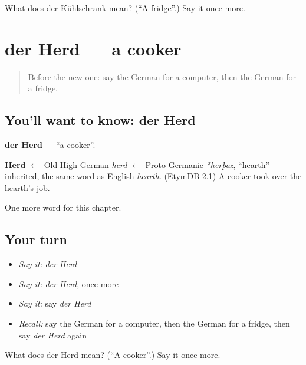 \begin{tcolorbox}[breakable,colback=teal!4,colframe=teal!35!black,title={Before you move on}]
What does der Kühlschrank mean? (\textquotedblleft{}A fridge\textquotedblright{}.) Say it once more.
\end{tcolorbox}
\section[der Herd]{der Herd — a cooker}

\label{lesson:GE-C112-herd}



\begin{quote}
Before the new one: say the German for a computer, then the German for a fridge.
\end{quote}

\subsection*{You'll want to know: der Herd}
\textbf{der Herd} — \textquotedblleft{}a cooker\textquotedblright{}.

\begin{cousinweb}
\textbf{Herd} $\leftarrow$ Old High German \emph{herd} $\leftarrow$ Proto-Germanic \emph{*herþaz}, \textquotedblleft{}hearth\textquotedblright{} — inherited, the same word as English \emph{hearth}. (EtymDB 2.1) A cooker took over the hearth's job.
\end{cousinweb}

\begin{grammarlens}[title={What you've built}]
One more word for this chapter.
\end{grammarlens}

\subsection*{Your turn}
\begin{itemize}
\raggedright
  \item \emph{Say it:} \emph{der Herd}
  \item \emph{Say it:} \emph{der Herd}, once more
  \item \emph{Say it:} say \emph{der Herd}
  \item \emph{Recall:} say the German for a computer, then the German for a fridge, then say \emph{der Herd} again
\end{itemize}

\begin{tcolorbox}[breakable,colback=teal!4,colframe=teal!35!black,title={Before you move on}]
What does der Herd mean? (\textquotedblleft{}A cooker\textquotedblright{}.) Say it once more.
\end{tcolorbox}
